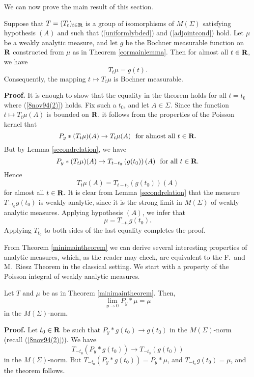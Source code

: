\bigskip

We can now prove the main result of this section.
\begin{minimaintheorem}
Suppose that $T=(T_t)_{t\in\R}$ is a
 group of isomorphisms of $M(\Sigma)$ 
satisfying hypothesis $(A)$ and such that
(\ref{uniformlybded}) and (\ref{adjointcond}) hold.
Let $\mu$ be a weakly analytic measure, and let $g$ 
be the Bochner measurable function on $\R$ 
constructed from $\mu$ as in Theorem \ref{cormainlemma}.  Then
for almost all $t\in\R$, we have
$$T_t\mu=g(t).$$
Consequently, the mapping $t\mapsto T_t\mu$ is Bochner measurable.
\label{minimaintheorem}
\end{minimaintheorem}
{\bf Proof.} It is enough to show that the 
equality in the theorem holds for all 
$t=t_0$ where (\ref{8nov94(2)}) holds.  
Fix such a $t_0$, and let $A\in \Sigma$.  Since the function 
$t\mapsto T_t\mu(A)$ is bounded on $\R$, it 
follows from the properties of the Poisson kernel that
$$P_y*(T_t\mu)(A)\rightarrow T_t\mu(A)\ \ {\rm for\ almost\ all}\ t\in \R.$$
But by Lemma \ref{secondrelation}, we have
$$P_y*(T_t\mu)(A)\rightarrow T_{t-t_0}
\left(g(t_0)\right)(A)\ \ {\rm for\ all}\ t\in \R.$$
Hence
$$T_t\mu (A)=T_{t-t_0}(g(t_0))(A)$$
for almost all $t\in \R$.  
It is clear from Lemma \ref{secondrelation} that the measure
$T_{-t_0}g(t_0)$ is weakly analytic, since it is the
strong limit in $M(\Sigma)$ of weakly analytic measures.
Applying hypothesis $(A)$, we infer that
$$\mu=T_{-t_0}g(t_0).$$
Applying $T_{t_0}$ to both 
sides of the last equality completes the proof.

\bigskip
From Theorem \ref{minimaintheorem} we can derive several interesting 
properties of analytic measures, which, as the reader may check, 
are equivalent to the F.\ and M.\ Riesz Theorem in the classical  
setting.  We start with a property of the 
Poisson integral of weakly analytic measures. 
\begin{poissonlimit}
Let $T$ and $\mu$ be as in Theorem \ref{minimaintheorem}.
Then,
$$\lim_{y\rightarrow 0} P_y*\mu= \mu$$
in the $M(\Sigma)$-norm.
\label{poissonlimit}
\end{poissonlimit}
{\bf Proof.} 
Let $t_0\in \R$ be such that $P_y*g(t_0)\rightarrow g(t_0)$
in the $M(\Sigma)$-norm (recall (\ref{8nov94(2)})).  
We have
$$T_{-t_0}\left( P_y*g(t_0)\right)\rightarrow T_{-t_0}\left(g(t_0)\right)$$
in the $M(\Sigma)$-norm.  But
$T_{-t_0}\left( P_y*g(t_0)\right)=P_y*\mu$,
and 
$T_{-t_0} g(t_0)=\mu$, and the theorem follows.

